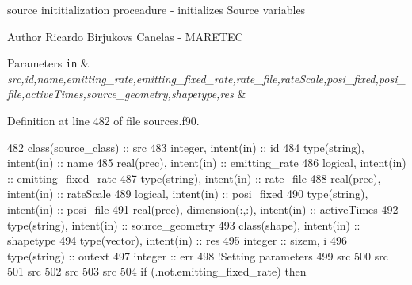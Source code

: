 source inititialization proceadure -\/ initializes Source variables 

\begin{DoxyAuthor}{Author}
Ricardo Birjukovs Canelas -\/ M\+A\+R\+E\+T\+EC 
\end{DoxyAuthor}

\begin{DoxyParams}[1]{Parameters}
\mbox{\tt in}  & {\em src,id,name,emitting\+\_\+rate,emitting\+\_\+fixed\+\_\+rate,rate\+\_\+file,rate\+Scale,posi\+\_\+fixed,posi\+\_\+file,active\+Times,source\+\_\+geometry,shapetype,res} & \\
\hline
\end{DoxyParams}


Definition at line 482 of file sources.\+f90.


\begin{DoxyCode}
482     \textcolor{keywordtype}{class}(source\_class) :: src
483     \textcolor{keywordtype}{integer}, \textcolor{keywordtype}{intent(in)} :: id
484     \textcolor{keywordtype}{type}(string), \textcolor{keywordtype}{intent(in)} :: name
485     \textcolor{keywordtype}{real(prec)}, \textcolor{keywordtype}{intent(in)} :: emitting\_rate
486     \textcolor{keywordtype}{logical}, \textcolor{keywordtype}{intent(in)} :: emitting\_fixed\_rate
487     \textcolor{keywordtype}{type}(string), \textcolor{keywordtype}{intent(in)} :: rate\_file
488     \textcolor{keywordtype}{real(prec)}, \textcolor{keywordtype}{intent(in)} :: rateScale
489     \textcolor{keywordtype}{logical}, \textcolor{keywordtype}{intent(in)} :: posi\_fixed
490     \textcolor{keywordtype}{type}(string), \textcolor{keywordtype}{intent(in)} :: posi\_file
491     \textcolor{keywordtype}{real(prec)}, \textcolor{keywordtype}{dimension(:,:)}, \textcolor{keywordtype}{intent(in)} :: activeTimes
492     \textcolor{keywordtype}{type}(string), \textcolor{keywordtype}{intent(in)} :: source\_geometry
493     \textcolor{keywordtype}{class}(shape), \textcolor{keywordtype}{intent(in)} :: shapetype
494     \textcolor{keywordtype}{type}(vector), \textcolor{keywordtype}{intent(in)} :: res
495     \textcolor{keywordtype}{integer} :: sizem, i
496     \textcolor{keywordtype}{type}(string) :: outext
497     \textcolor{keywordtype}{integer} :: err
498     \textcolor{comment}{!Setting parameters}
499     src%
500     src%
501     src%
502     src%
503     src%
504     \textcolor{keywordflow}{if} (.not.emitting\_fixed\_rate) \textcolor{keywordflow}{then}

\end{DoxyCode}
